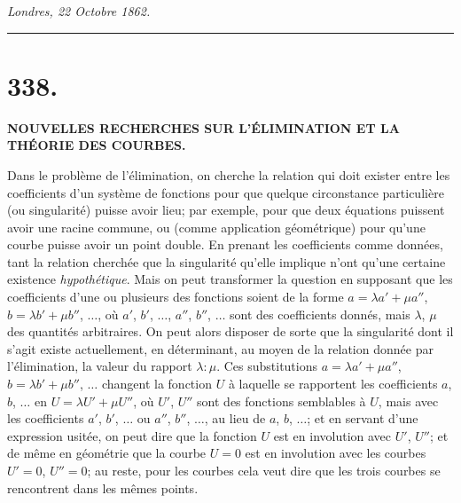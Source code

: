 \documentclass[11pt,a4paper]{article}
\begin{document}
\bigskip

\noindent\textit{Londres, 22 Octobre 1862.}

\bigskip

\noindent\rule{\textwidth}{0.4pt}
\vspace{1em}

\section*{338.}

\begin{center}
\textbf{NOUVELLES RECHERCHES SUR L'\'ELIMINATION ET LA TH\'EORIE DES COURBES.}
\end{center}


\bigskip

\noindent Dans le probl\`{e}me de l'\'{e}limination, on cherche la relation qui doit exister entre les coefficients d'un syst\`{e}me de fonctions pour que quelque circonstance particuli\`{e}re (ou singularit\'{e}) puisse avoir lieu; par exemple, pour que deux \'{e}quations puissent avoir une racine commune, ou (comme application g\'{e}om\'{e}trique) pour qu'une courbe puisse avoir un point double. En prenant les coefficients comme donn\'{e}es, tant la relation cherch\'{e}e que la singularit\'{e} qu'elle implique n'ont qu'une certaine existence \textit{hypoth\'{e}tique}. Mais on peut transformer la question en supposant que les coefficients d'une ou plusieurs des fonctions soient de la forme $a = \lambda a' + \mu a''$, $b = \lambda b' + \mu b''$, $\ldots$, o\`{u} $a'$, $b'$, $\ldots$, $a''$, $b''$, $\ldots$ sont des coefficients donn\'{e}s, mais $\lambda$, $\mu$ des quantit\'{e}s arbitraires. On peut alors disposer de sorte que la singularit\'{e} dont il s'agit existe actuellement, en d\'{e}terminant, au moyen de la relation donn\'{e}e par l'\'{e}limination, la valeur du rapport $\lambda : \mu$. Ces substitutions $a = \lambda a' + \mu a''$, $b = \lambda b' + \mu b''$, $\ldots$ changent la fonction $U$ \`{a} laquelle se rapportent les coefficients $a$, $b$, $\ldots$ en $U=\lambda U' + \mu U''$, o\`{u} $U'$, $U''$ sont des fonctions semblables \`{a} $U$, mais avec les coefficients $a'$, $b'$, $\ldots$ ou $a''$, $b''$, $\ldots$, au lieu de $a$, $b$, $\ldots$; et en servant d'une expression usit\'{e}e, on peut dire que la fonction $U$ est en involution avec $U'$, $U''$; et de m\^{e}me en g\'{e}om\'{e}trie que la courbe $U=0$ est en involution avec les courbes $U'=0$, $U''=0$; au reste, pour les courbes cela veut dire que les trois courbes se rencontrent dans les m\^{e}mes points.
\end{document}

